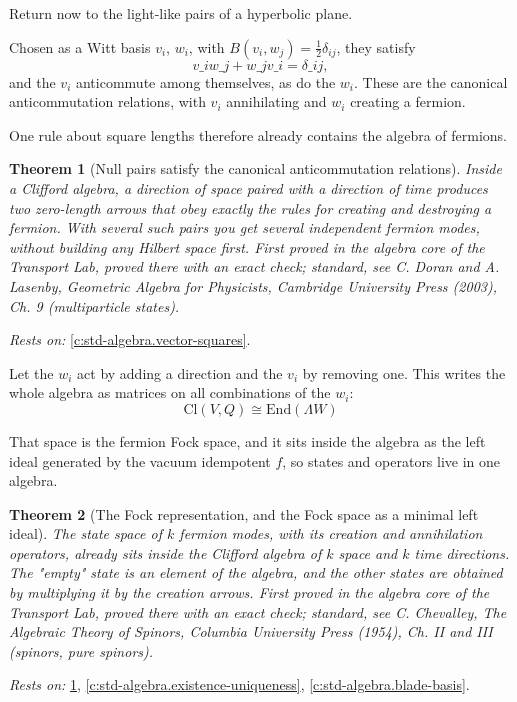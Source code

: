 \documentclass[11pt]{article}
\newtheorem{theorem}{Theorem}[section]
\theoremstyle{definition}
\theoremstyle{plain}
\providecommand{\Cl}{}\renewcommand{\Cl}{\mathrm{Cl}}
\providecommand{\End}{}\renewcommand{\End}{\mathrm{End}}
\begin{document}
Return now to the light-like pairs of a hyperbolic plane.

Chosen as a Witt basis $v_i$, $w_i$, with $B(v_i, w_j) = \tfrac12 \delta_{ij}$, they satisfy \[ v\_i w\_j + w\_j v\_i = \delta\_{ij}, \] and the $v_i$ anticommute among themselves, as do the $w_i$. These are the canonical anticommutation relations, with $v_i$ annihilating and $w_i$ creating a fermion.

One rule about square lengths therefore already contains the algebra of fermions.

\begin{theorem}[Null pairs satisfy the canonical anticommutation relations]\label{c:std-algebra.witt-basis-car}
Inside a Clifford algebra, a direction of space paired with a direction of time produces two zero-length arrows that obey exactly the rules for creating and destroying a fermion. With several such pairs you get several independent fermion modes, without building any Hilbert space first.
\emph{First proved in} the algebra core of the Transport Lab, proved there with an exact check; standard, see C. Doran and A. Lasenby, Geometric Algebra for Physicists, Cambridge University Press (2003), Ch. 9 (multiparticle states).
\end{theorem}
\noindent\emph{Rests on:} \ref{c:std-algebra.vector-squares}.

Let the $w_i$ act by adding a direction and the $v_i$ by removing one. This writes the whole algebra as matrices on all combinations of the $w_i$: \[ \Cl(V, Q) \cong \End(\Lambda W) \]

That space is the fermion Fock space, and it sits inside the algebra as the left ideal generated by the vacuum idempotent $f$, so states and operators live in one algebra.

\begin{theorem}[The Fock representation, and the Fock space as a minimal left ideal]\label{c:std-algebra.fock-representation}
The state space of $k$ fermion modes, with its creation and annihilation operators, already sits inside the Clifford algebra of $k$ space and $k$ time directions. The "empty" state is an element of the algebra, and the other states are obtained by multiplying it by the creation arrows.
\emph{First proved in} the algebra core of the Transport Lab, proved there with an exact check; standard, see C. Chevalley, The Algebraic Theory of Spinors, Columbia University Press (1954), Ch. II and III (spinors, pure spinors).
\end{theorem}
\noindent\emph{Rests on:} \ref{c:std-algebra.witt-basis-car}, \ref{c:std-algebra.existence-uniqueness}, \ref{c:std-algebra.blade-basis}.
\end{document}
